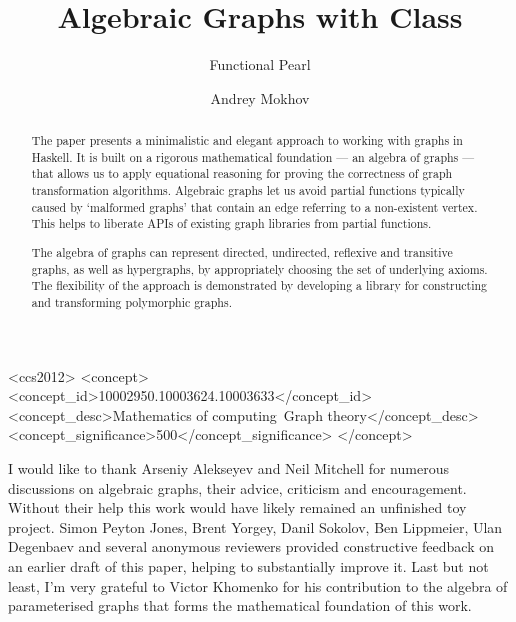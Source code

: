 \documentclass[sigplan,authorversion]{acmart}
\begin{document}
\title{Algebraic Graphs with Class\vspace{-1.5mm}}
\subtitle{Functional Pearl}

\author{Andrey Mokhov}

\begin{abstract}
The paper presents a minimalistic and elegant approach to working
with graphs in Haskell. It is built on a rigorous
mathematical foundation --- an algebra of graphs --- that allows us to apply
equational reasoning for proving the correctness of graph transformation
algorithms. Algebraic graphs let us avoid partial functions typically
caused by `malformed graphs' that contain an edge referring to
a non-existent vertex. This helps to liberate APIs of existing graph libraries
from partial functions.

The algebra of graphs can represent directed, undirected, reflexive
and transitive graphs, as well as hypergraphs, by appropriately choosing
the set of underlying axioms. The flexibility of the approach is
demonstrated by developing a library for constructing
and transforming polymorphic graphs.
\end{abstract}

\begin{CCSXML}
<ccs2012>
<concept>
<concept_id>10002950.10003624.10003633</concept_id>
<concept_desc>Mathematics of computing~Graph theory</concept_desc>
<concept_significance>500</concept_significance>
</concept>
\end{CCSXML}


\maketitle









\begin{acks}
  I would like to thank Arseniy Alekseyev and Neil Mitchell
  for numerous discussions on algebraic graphs, their advice,
  criticism and encouragement. Without their help this work would
  have likely remained an unfinished toy project.
  Simon Peyton Jones, Brent Yorgey, Danil Sokolov, Ben Lippmeier, Ulan Degenbaev
  and several anonymous reviewers provided constructive feedback on an
  earlier draft of this paper, helping to substantially improve it. Last but
  not least, I'm very grateful to Victor Khomenko for his contribution to the
  algebra of parameterised graphs that forms the mathematical foundation of this work.
\end{acks}


\end{document}
